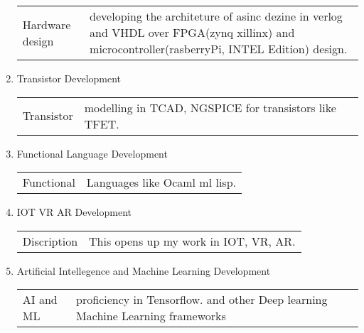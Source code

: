 \documentclass[letterpaper,11pt]{article}
\begin{document}
\begin{enumerate}
\begin{center}
\begin{tabular}{p{3cm} p{13cm} }
		Hardware design& developing the architeture of asinc dezine in verlog and VHDL over FPGA(zynq xillinx) and microcontroller(rasberryPi, INTEL Edition) design.\\
	\end{tabular}
 \end{center}
\item Transistor Development\\
 \begin{center}
	\begin{tabular}{p{3cm} p{13cm} }
		Transistor& modelling in TCAD, NGSPICE for transistors like TFET.\\ 
	\end{tabular}
 \end{center}
\item Functional Language Development\\
 \begin{center}
	\begin{tabular}{p{3cm} p{13cm} }
		Functional& Languages like Ocaml ml lisp.\\
	\end{tabular}
 \end{center}
\item IOT VR AR Development\\
 \begin{center}
	\begin{tabular}{p{3cm} p{13cm} }
		Discription&This opens up my work in IOT, VR, AR.\\
	\end{tabular}
 \end{center}
\item Artificial Intellegence and Machine Learning Development\\
 \begin{center}
	\begin{tabular}{p{3cm} p{13cm} }
		AI and ML& proficiency in Tensorflow. and other Deep learning Machine Learning frameworks\\
	\end{tabular}
 \end{center}
\end{enumerate}
\end{document}
